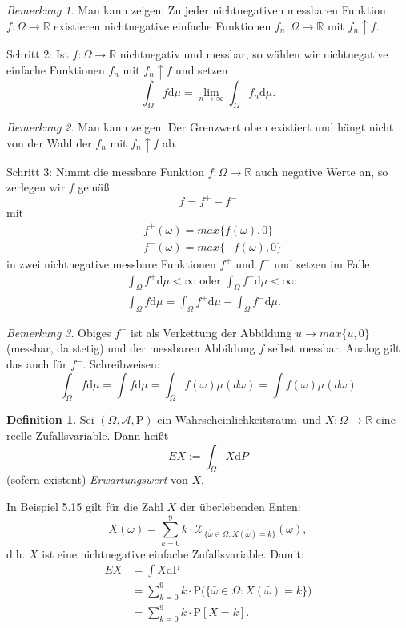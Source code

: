 \documentclass[a4paper,12pt,fleqn]{scrartcl}
\newcommand{\R}{\mathbb{R}}
\newcommand{\m}[1]{\mathcal{ #1 }}
\newcommand{\p}[1]{\text{P(} #1 \text{)}}
\newcommand{\WR}{Wahrscheinlichkeitsraum}
\newcommand{\ZV}{Zufallsvariable}
\theoremstyle{definition}
\newtheorem{definition}{Definition}[section]
\theoremstyle{plain}
\theoremstyle{remark}
\newtheorem*{bemerkung}{Bemerkung}
\begin{document}
\begin{bemerkung}
Man kann zeigen: Zu jeder nichtnegativen messbaren Funktion $f: \Omega \rightarrow \R$ existieren nichtnegative einfache Funktionen $f_n: \Omega \rightarrow \R$ mit $f_n \uparrow f$.
\end{bemerkung}
Schritt 2: Ist $f: \Omega \rightarrow \R$ nichtnegativ und messbar, so wählen wir nichtnegative einfache Funktionen $f_n$ mit $f_n \uparrow f$ und setzen
\[\int_\Omega f \mathrm{d}\mu = \lim_{n \rightarrow \infty} \int_\Omega f_n \mathrm{d}\mu.\]
\begin{bemerkung}
Man kann zeigen: Der Grenzwert oben existiert und hängt nicht von der Wahl der $f_n$ mit $f_n \uparrow f$ ab.
\end{bemerkung}
Schritt 3: Nimmt die messbare Funktion $f: \Omega \rightarrow \R$ auch negative Werte an, so zerlegen wir $f$ gemäß
\[f = f^+ - f^-\]
mit
\begin{align*}
&f^+(\omega) = max\{f(\omega), 0\} \\&f^-(\omega) = max\{-f(\omega), 0\}
\end{align*}
in zwei nichtnegative messbare Funktionen $f^+$ und $f^-$ und setzen im Falle
\begin{align*}
&\int_\Omega f^+ \mathrm{d}\mu < \infty \text{ oder } \int_\Omega f^- \mathrm{d}\mu < \infty: \\
&\int_\Omega f \mathrm{d}\mu = \int_\Omega f^+ \mathrm{d}\mu - \int_\Omega f^- \mathrm{d}\mu.
\end{align*}
\begin{bemerkung}
Obiges $f^+$ ist als Verkettung der Abbildung $u \rightarrow max\{u, 0\}$ (messbar, da stetig) und der messbaren Abbildung $f$ selbst messbar. Analog gilt das auch für $f^-$. Schreibweisen:
\[\int_\Omega f \mathrm{d}\mu = \int f \mathrm{d}\mu = \int_\Omega f(\omega) \mu(d\omega) = \int f(\omega) \mu(d\omega)\]
\end{bemerkung}
\begin{definition}
Sei $(\Omega, \m{A}, \text{P})$ ein \WR \, und $X: \Omega \rightarrow \R$ eine reelle \ZV. Dann heißt
\[EX := \int_\Omega X \mathrm{d}P\]
(sofern existent) \emph{Erwartungswert} von $X$.
\end{definition}
In Beispiel 5.15 gilt für die Zahl $X$ der überlebenden Enten:
\[X(\omega) = \sum_{k=0}^9 k \cdot \m{X}_{\{\bar{\omega} \in \Omega : X(\bar{\omega}) = k\}}(\omega),\]
d.h. $X$ ist eine nichtnegative einfache \ZV. Damit:
\begin{align*}
EX &= \int X \mathrm{d}\text{P} \\
&= \sum_{k=0}^9 k \cdot \p{\{\bar{\omega} \in \Omega : X(\bar{\omega}) = k\}}\\
&= \sum_{k=0}^9 k \cdot \text{P}[X=k].
\end{align*}
\end{document}

